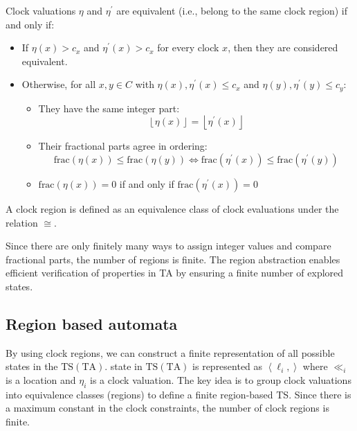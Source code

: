 \begin{definition}
    Clock valuations $\eta$ and $\eta^\prime$  are equivalent (i.e., belong to the same clock region) if and only if:
    \begin{itemize}
        \item If $\eta(x)>c_x$ and $\eta^\prime(x)>c_x$ for every clock $x$, then they are considered equivalent.
        \item Otherwise, for all $x,y\in C$ with $\eta(x), \eta^\prime(x)\leq c_x$ and $\eta(y), \eta^\prime(y)\leq c_y$: 
            \begin{itemize}
                \item They have the same integer part: 
                    \[\left\lfloor \eta(x)\right\rfloor=\left\lfloor \eta^\prime(x)\right\rfloor\]
                \item Their fractional parts agree in ordering: 
                    \[\text{frac}(\eta(x))\leq\text{frac}(\eta(y))\Leftrightarrow\text{frac}(\eta^\prime(x))\leq\text{frac}(\eta^\prime(y))\]
                \item $\text{frac}(\eta(x))=0$ if and only if $\text{frac}(\eta^\prime(x))=0$
            \end{itemize}
    \end{itemize}
\end{definition}
\begin{definition}
    A clock region is defined as an equivalence class of clock evaluations under the relation $\cong$. 
\end{definition}
\noindent Since there are only finitely many ways to assign integer values and compare fractional parts, the number of regions is finite.
The region abstraction enables efficient verification of properties in TA by ensuring a finite number of explored states.

\subsection{Region based automata}
By using clock regions, we can construct a finite representation of all possible states in the $\text{TS}(\text{TA})$.
state in $\text{TS}(\text{TA})$ is represented as $\left\langle \ell_i,\right\rangle$ where $\ll_i$ is a location and $\eta_i$ is a clock valuation.
The key idea is to group clock valuations into equivalence classes (regions) to define a finite region-based TS.
Since there is a maximum constant in the clock constraints, the number of clock regions is finite.


